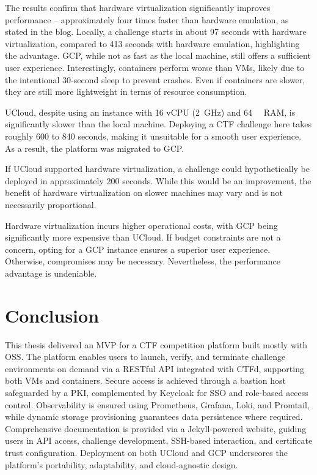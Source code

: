 The results confirm that hardware virtualization significantly improves performance -- approximately four times faster than hardware emulation, as stated in the blog. Locally, a challenge starts in about 97 seconds with hardware virtualization, compared to 413 seconds with hardware emulation, highlighting the advantage. GCP, while not as fast as the local machine, still offers a sufficient user experience. Interestingly, containers perform worse than VMs, likely due to the intentional 30-second sleep to prevent crashes. Even if containers are slower, they are still more lightweight in terms of resource consumption.

UCloud, despite using an instance with 16 vCPU (\SI{2}{\giga\hertz}) and \SI{64}{\giga\byte} RAM, is significantly slower than the local machine. Deploying a CTF challenge here takes roughly 600 to 840 seconds, making it unsuitable for a smooth user experience. As a result, the platform was migrated to GCP.

If UCloud supported hardware virtualization, a challenge could hypothetically be deployed in approximately 200 seconds. While this would be an improvement, the benefit of hardware virtualization on slower machines may vary and is not necessarily proportional.

Hardware virtualization incurs higher operational costs, with GCP being significantly more expensive than UCloud. If budget constraints are not a concern, opting for a GCP instance ensures a superior user experience. Otherwise, compromises may be necessary. Nevertheless, the performance advantage is undeniable.

\chapter{Conclusion}
This thesis delivered an MVP for a CTF competition platform built mostly with OSS. The platform enables users to launch, verify, and terminate challenge environments on demand via a RESTful API integrated with CTFd, supporting both VMs and containers. Secure access is achieved through a bastion host safeguarded by a PKI, complemented by Keycloak for SSO and role-based access control. Observability is ensured using Prometheus, Grafana, Loki, and Promtail, while dynamic storage provisioning guarantees data persistence where required. Comprehensive documentation is provided via a Jekyll-powered website, guiding users in API access, challenge development, SSH-based interaction, and certificate trust configuration. Deployment on both UCloud and GCP underscores the platform's portability, adaptability, and cloud-agnostic design.

